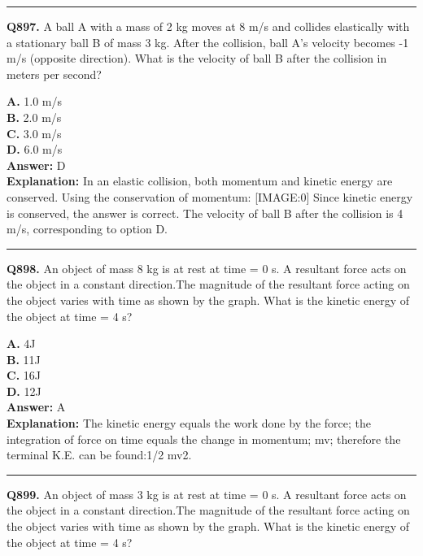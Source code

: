 \documentclass[12pt]{article}
\begin{document}
\hrule
\vspace{1em}


\noindent
\textbf{Q897.} A ball A with a mass of 2 kg moves at 8 m/s and collides elastically with a stationary ball B of mass 3 kg. After the collision, ball A's velocity becomes -1 m/s (opposite direction). What is the velocity of ball B after the collision in meters per second?



\textbf{A.} 1.0 m/s \\
\textbf{B.} 2.0 m/s \\
\textbf{C.} 3.0 m/s \\
\textbf{D.} 6.0 m/s \\

\textbf{Answer:} D \\
\textbf{Explanation:} In an elastic collision, both momentum and kinetic energy are conserved. Using the conservation of momentum:
[IMAGE:0]
Since kinetic energy is conserved, the answer is correct. The velocity of ball B after the collision is 4 m/s, corresponding to option D.

\hrule
\vspace{1em}


\noindent
\textbf{Q898.} An object of mass 8 kg is at rest at time = 0 s. A resultant force acts on the object in a constant direction.The magnitude of the resultant force acting on the object varies with time as shown by the graph.
What is the kinetic energy of the object at time = 4 s?



\textbf{A.} 4J \\
\textbf{B.} 11J \\
\textbf{C.} 16J \\
\textbf{D.} 12J \\

\textbf{Answer:} A \\
\textbf{Explanation:} The kinetic energy equals the work done by the force; the integration of force on time equals the change in momentum; mv; therefore the terminal K.E. can be found:1/2 mv2.

\hrule
\vspace{1em}


\noindent
\textbf{Q899.} An object of mass 3 kg is at rest at time = 0 s. A resultant force acts on the object in a constant direction.The magnitude of the resultant force acting on the object varies with time as shown by the graph.
What is the kinetic energy of the object at time = 4 s?
\end{document}
